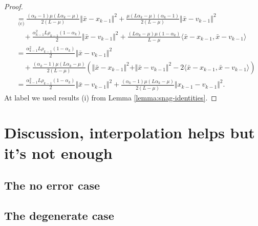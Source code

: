\documentclass[12pt]{article}
\begin{document}
\begin{proof}
{\begin{align*}
                &\underset{\text{(c)}}{=}
                \frac{(\alpha_k - 1)\mu(L\alpha_k - \mu)}{2(L - \mu)}\Vert \bar x - x_{k - 1}\Vert^2
                + 
                \frac{\mu(L\alpha_k - \mu)(\alpha_k - 1)}{2(L - \mu)}\Vert \bar x - v_{k - 1}\Vert^2
                \\ &\quad 
                    + \frac{\alpha_{k - 1}^2L \rho_{k - 1}(1 - \alpha_k)}{2}\Vert \bar x - v_{k - 1}\Vert^2
                    + \frac{(L\alpha_k - \mu)\mu(1 - \alpha_k)}{L - \mu}\langle \bar x - x_{k - 1}, \bar x - v_{k - 1}\rangle
                \\
                &= 
                \frac{\alpha_{k - 1}^2L \rho_{k - 1}(1 - \alpha_k)}{2}\Vert \bar x - v_{k - 1}\Vert^2
                \\ & \quad
                    + \frac{(\alpha_k - 1)\mu(L\alpha_k - \mu)}{2(L - \mu)}\left(
                        \Vert \bar x - x_{k - 1}\Vert^2 + \Vert \bar x - v_{k - 1}\Vert^2 - 2\langle\bar x - x_{k - 1},\bar x - v_{k - 1} \rangle
                    \right)
                \\
                &= \frac{\alpha_{k - 1}^2L \rho_{k - 1}(1 - \alpha_k)}{2}\Vert \bar x - v_{k - 1}\Vert^2
                + \frac{(\alpha_k - 1)\mu(L\alpha_k - \mu)}{2(L - \mu)}\Vert x_{k - 1} - v_{k - 1}\Vert^2. 
            \end{align*}
            }
            At label  we used results (i) from Lemma \ref{lemma:snag-identities}. 
        \end{proof}

\section{Discussion, interpolation helps but it's not enough}
    \subsection{The no error case}
    \subsection{The degenerate case}




\end{document}

